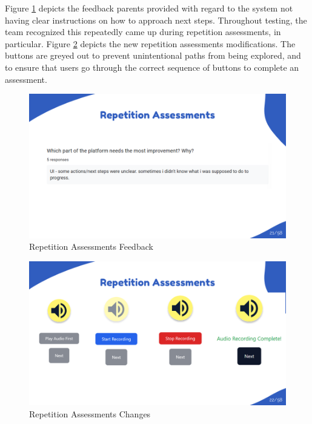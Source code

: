 \documentclass{article}
\begin{document}
\newpage

Figure \ref{fig:rep_feedback_parents} depicts the feedback parents provided with regard to the system not having clear instructions on how to approach next steps. Throughout testing, the team recognized this repeatedly came up during repetition assessments, in particular.
Figure \ref{fig:rep_changes} depicts the new repetition assessments modifications. The buttons are greyed out to prevent unintentional paths from being explored, and to ensure that users
go through the correct sequence of buttons to complete an assessment.

\begin{figure}[H]
  \centering
  \includegraphics[width=\textwidth]{images/slide21.png}
  \caption{Repetition Assessments Feedback}
  \label{fig:rep_feedback_parents}
\end{figure}

\begin{figure}[H]
  \centering
  \includegraphics[width=\textwidth]{images/slide22.png}
  \caption{Repetition Assessments Changes}
  \label{fig:rep_changes}
\end{figure}
\end{document}
